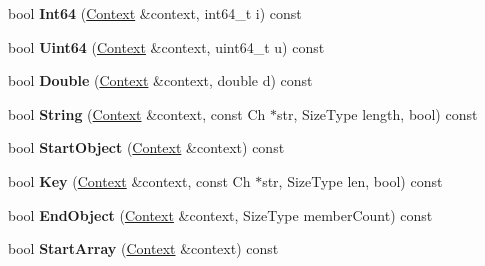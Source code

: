 \begin{DoxyCompactItemize}
\item 
bool {\bfseries Int64} (\hyperlink{structinternal_1_1_schema_validation_context}{Context} \&context, int64\+\_\+t i) const \hypertarget{classinternal_1_1_schema_a4aa9da1fd0cb4c19dcaaeebbc8abf1dc}{}\label{classinternal_1_1_schema_a4aa9da1fd0cb4c19dcaaeebbc8abf1dc}

\item 
bool {\bfseries Uint64} (\hyperlink{structinternal_1_1_schema_validation_context}{Context} \&context, uint64\+\_\+t u) const \hypertarget{classinternal_1_1_schema_afb862d9aee4bbe2aa99e0f44ec90b9d8}{}\label{classinternal_1_1_schema_afb862d9aee4bbe2aa99e0f44ec90b9d8}

\item 
bool {\bfseries Double} (\hyperlink{structinternal_1_1_schema_validation_context}{Context} \&context, double d) const \hypertarget{classinternal_1_1_schema_aaf4ff1cb84013ff1a82ecb59cac38bfe}{}\label{classinternal_1_1_schema_aaf4ff1cb84013ff1a82ecb59cac38bfe}

\item 
bool {\bfseries String} (\hyperlink{structinternal_1_1_schema_validation_context}{Context} \&context, const Ch $\ast$str, Size\+Type length, bool) const \hypertarget{classinternal_1_1_schema_a2bc7b83a75b84c241e733be9d356a2c4}{}\label{classinternal_1_1_schema_a2bc7b83a75b84c241e733be9d356a2c4}

\item 
bool {\bfseries Start\+Object} (\hyperlink{structinternal_1_1_schema_validation_context}{Context} \&context) const \hypertarget{classinternal_1_1_schema_a907b715d5f817d337a3e18759f3ac0e4}{}\label{classinternal_1_1_schema_a907b715d5f817d337a3e18759f3ac0e4}

\item 
bool {\bfseries Key} (\hyperlink{structinternal_1_1_schema_validation_context}{Context} \&context, const Ch $\ast$str, Size\+Type len, bool) const \hypertarget{classinternal_1_1_schema_af0855cd2ee33929513dd8b148bfa9017}{}\label{classinternal_1_1_schema_af0855cd2ee33929513dd8b148bfa9017}

\item 
bool {\bfseries End\+Object} (\hyperlink{structinternal_1_1_schema_validation_context}{Context} \&context, Size\+Type member\+Count) const \hypertarget{classinternal_1_1_schema_ac66720d141d8c811cb2c71da05509618}{}\label{classinternal_1_1_schema_ac66720d141d8c811cb2c71da05509618}

\item 
bool {\bfseries Start\+Array} (\hyperlink{structinternal_1_1_schema_validation_context}{Context} \&context) const \hypertarget{classinternal_1_1_schema_a6340166b92577ce0ef9b7735f66937ec}{}\label{classinternal_1_1_schema_a6340166b92577ce0ef9b7735f66937ec}


\end{DoxyCompactItemize}
